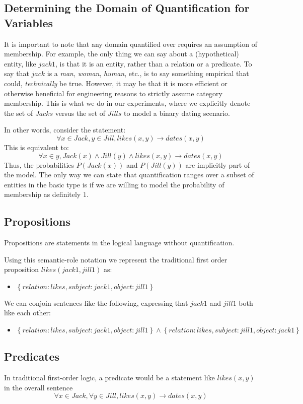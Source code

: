 \documentclass[12pt]{article}
\begin{document}
\subsection{Determining the Domain of Quantification for Variables}
It is important to note that any domain quantified over requires an assumption of membership.
For example, the only thing we can say about a (hypothetical) entity, like \( jack1 \), is that it is an entity, rather than a relation or a predicate.
To say that \( jack \) is a \emph{man}, \emph{woman}, \emph{human}, etc., is to say something empirical that could, \emph{technically} be true.
However, it may be that it is more efficient or otherwise beneficial for engineering reasons to strictly assume category membership.
This is what we do in our experiments, where we explicitly denote the set of \( Jacks \) versus the set of \( Jills \) to model a binary dating scenario.

In other words, consider the statement:
\[ \forall x \in Jack, y \in Jill, likes(x, y) \rightarrow dates(x, y) \]
This is equivalent to:
\[\forall x \in  y, Jack(x) \wedge Jill(y) \wedge likes(x, y) \rightarrow dates(x, y) \]
Thus, the probabilities $P(Jack(x))$ and $P(Jill(y))$ are implicitly part of the model.
The only way we can state that quantification ranges over a subset of entities in the basic type is if we are willing to model the probability of membership as definitely $1$.

\subsection{Propositions}
Propositions are statements in the logical language without quantification.

Using this semantic-role notation we represent the traditional first order proposition $likes(jack1, jill1)$ as:
\begin{itemize}
    \item $\left\{relation:likes, subject:jack1, object:jill1 \right\}$
\end{itemize}

We can conjoin sentences like the following, expressing that $jack1$ and $jill1$ both like each other:
\begin{itemize}
    \item $\left\{relation:likes, subject:jack1, object:jill1 \right\} \wedge \left\{relation:likes, subject:jill1, object:jack1 \right\}$
\end{itemize}

\subsection{Predicates}
In traditional first-order logic, a predicate would be a statement like $likes(x, y)$ in the overall sentence
\[ \forall x\in Jack, \forall y \in Jill, likes(x,y) \rightarrow dates(x, y) \]
\end{document}
